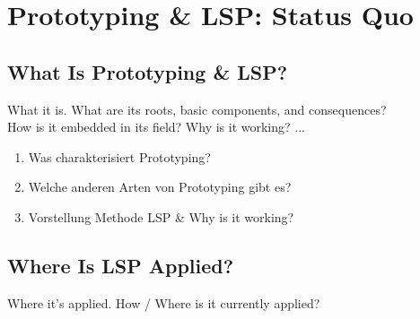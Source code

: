 \section{Prototyping \& LSP: Status Quo}\label{sec:statusQuo}

\subsection{What Is Prototyping \& LSP?}
What it is. What are its roots, basic components, and consequences? \\
How is it embedded in its field? Why is it working? ... 
\begin{enumerate}
    \item Was charakterisiert Prototyping?
    \item Welche anderen Arten von Prototyping gibt es?
    \item Vorstellung Methode LSP \& Why is it working?
\end{enumerate}


\subsection{Where Is LSP Applied?}\label{ssec:application}
Where it’s applied. How / Where is it currently applied?